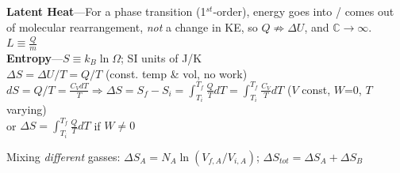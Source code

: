 \documentclass[letterpaper,landscape,10pt]{article}
\begin{document}
{\begin{multicols}{4}
  \vspace{2.5pt}
  \textbf{Latent Heat}---For a phase transition (1$^{st}$-order), energy goes
    into / comes out of molecular rearrangement, \emph{not} a change in KE, so $Q
	\nRightarrow \Delta U$, and $\mathbb{C}\rightarrow \infty$. \\
	\hspace{5pt} $L \equiv \frac{Q}{m}$ \\
  \vspace{2.5pt}
  \textbf{Entropy}---$S \equiv k_B\ln \Omega$; SI units of J/K \\
    \hspace{5pt} $\Delta S = \Delta U/T = Q/T$ (const. temp \& vol, no work)\\
	\hspace{5pt} $dS = Q/T =\frac{C_VdT}{T} \Rightarrow \Delta S = S_f-S_i = \int_{T_i}^{T_f}\frac{Q}{T}dT = \int_{T_i}^{T_f} \frac{C_V}{T}dT$ ($V$ const, $W$=0, $T$ varying)\\
	\hspace{5pt} or $\Delta S = \int_{T_i}^{T_f}\frac{Q}{T}dT$ if $W\ne0$

	\hspace{5pt} Mixing \emph{different} gasses: $\Delta S_{A}=N_{A}\ln(V_{f,A}/V_{i,A})$; $\Delta S_{tot} = \Delta S_A + \Delta S_B$ \\


\end{multicols}}
\end{document}
